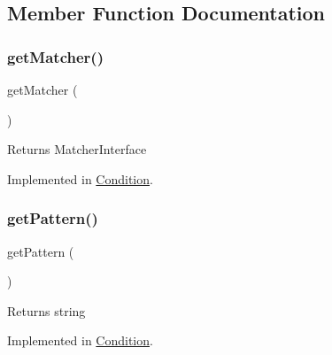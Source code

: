 \subsection{Member Function Documentation}
\mbox{\label{interface_pes_1_1_query_1_1_condition_interface_aad4538bdde7e273b32661681773c32f0}} 
\subsubsection{\texorpdfstring{get\+Matcher()}{getMatcher()}}
{\footnotesize\ttfamily get\+Matcher (\begin{DoxyParamCaption}{ }\end{DoxyParamCaption})}

\begin{DoxyReturn}{Returns}
Matcher\+Interface 
\end{DoxyReturn}


Implemented in \mbox{\hyperlink{class_pes_1_1_query_1_1_condition_aad4538bdde7e273b32661681773c32f0}{Condition}}.

\mbox{\label{interface_pes_1_1_query_1_1_condition_interface_a86d92279529520a45589a56c2247355e}} 
\subsubsection{\texorpdfstring{get\+Pattern()}{getPattern()}}
{\footnotesize\ttfamily get\+Pattern (\begin{DoxyParamCaption}{ }\end{DoxyParamCaption})}

\begin{DoxyReturn}{Returns}
string 
\end{DoxyReturn}


Implemented in \mbox{\hyperlink{class_pes_1_1_query_1_1_condition_a86d92279529520a45589a56c2247355e}{Condition}}.


